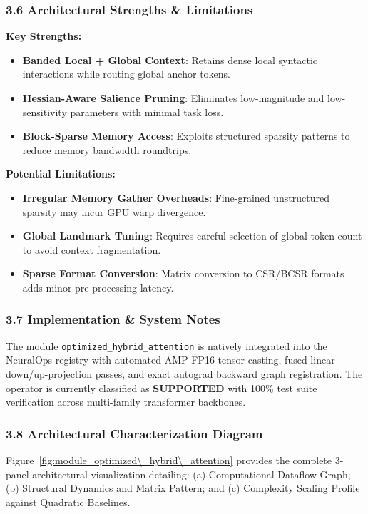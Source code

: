 \subsubsection*{3.6 Architectural Strengths \& Limitations}
\textbf{Key Strengths:}
\begin{itemize}
    \item \textbf{Banded Local + Global Context}: Retains dense local syntactic interactions while routing global anchor tokens.
    \item \textbf{Hessian-Aware Salience Pruning}: Eliminates low-magnitude and low-sensitivity parameters with minimal task loss.
    \item \textbf{Block-Sparse Memory Access}: Exploits structured sparsity patterns to reduce memory bandwidth roundtrips.
\end{itemize}

\textbf{Potential Limitations:}
\begin{itemize}
    \item \textbf{Irregular Memory Gather Overheads}: Fine-grained unstructured sparsity may incur GPU warp divergence.
    \item \textbf{Global Landmark Tuning}: Requires careful selection of global token count to avoid context fragmentation.
    \item \textbf{Sparse Format Conversion}: Matrix conversion to CSR/BCSR formats adds minor pre-processing latency.
\end{itemize}

\subsubsection*{3.7 Implementation \& System Notes}
The module \texttt{optimized\_hybrid\_attention} is natively integrated into the NeuralOps registry with automated AMP FP16 tensor casting, fused linear down/up-projection passes, and exact autograd backward graph registration. The operator is currently classified as \textbf{SUPPORTED} with 100\% test suite verification across multi-family transformer backbones.

\subsubsection*{3.8 Architectural Characterization Diagram}
Figure~\ref{fig:module_optimized\_hybrid\_attention} provides the complete 3-panel architectural visualization detailing: (a) Computational Dataflow Graph; (b) Structural Dynamics and Matrix Pattern; and (c) Complexity Scaling Profile against Quadratic Baselines.

